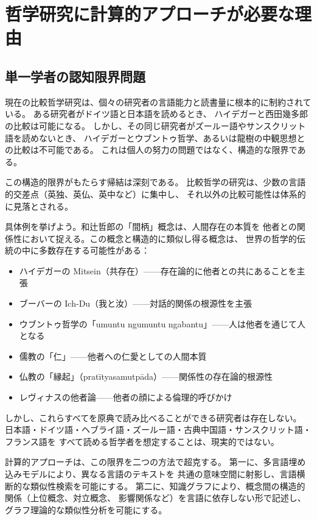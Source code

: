 \documentclass[a4paper,11pt]{ltjsarticle}
\begin{document}
\section{哲学研究に計算的アプローチが必要な理由}\label{sec:why}

\subsection{単一学者の認知限界問題}

現在の比較哲学研究は、個々の研究者の言語能力と読書量に根本的に制約されている。
ある研究者がドイツ語と日本語を読めるとき、
ハイデガーと西田幾多郎の比較は可能になる。
しかし、その同じ研究者がズールー語やサンスクリット語を読めないとき、
ハイデガーとウブントゥ哲学、あるいは龍樹の中観思想との比較は不可能である。
これは個人の努力の問題ではなく、構造的な限界である。

この構造的限界がもたらす帰結は深刻である。
比較哲学の研究は、少数の言語的交差点（英独、英仏、英中など）に集中し、
それ以外の比較可能性は体系的に見落とされる。

具体例を挙げよう。和辻哲郎の「間柄」概念は、人間存在の本質を
他者との関係性において捉える。この概念と構造的に類似し得る概念は、
世界の哲学的伝統の中に多数存在する可能性がある：

\begin{itemize}[leftmargin=2em]
  \item ハイデガーの Mitsein（共存在）——存在論的に他者との共にあることを主張
  \item ブーバーの Ich-Du（我と汝）——対話的関係の根源性を主張
  \item ウブントゥ哲学の「umuntu ngumuntu ngabantu」——人は他者を通じて人となる
  \item 儒教の「仁」——他者への仁愛としての人間本質
  \item 仏教の「縁起」（pratītyasamutpāda）——関係性の存在論的根源性
  \item レヴィナスの他者論——他者の顔による倫理的呼びかけ
\end{itemize}

しかし、これらすべてを原典で読み比べることができる研究者は存在しない。
日本語・ドイツ語・ヘブライ語・ズールー語・古典中国語・サンスクリット語・フランス語を
すべて読める哲学者を想定することは、現実的ではない。

計算的アプローチは、この限界を二つの方法で超克する。
第一に、多言語埋め込みモデルにより、異なる言語のテキストを
共通の意味空間に射影し、言語横断的な類似性検索を可能にする。
第二に、知識グラフにより、概念間の構造的関係（上位概念、対立概念、
影響関係など）を言語に依存しない形で記述し、
グラフ理論的な類似性分析を可能にする。
\end{document}
